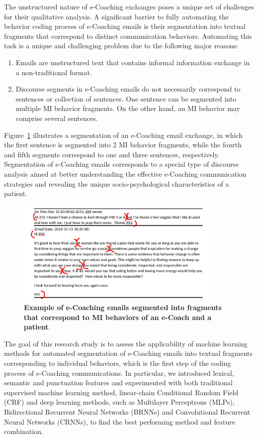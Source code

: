 \documentclass{amia}
\begin{document}
The unstructured nature of e-Coaching exchanges poses a unique set of challenges for their qualitative analysis. A significant barrier to fully automating the behavior coding process of e-Coaching emails is their segmentation into textual fragments that correspond to distinct communication behaviors. Automating this task is a unique and challenging problem due to the following major reasons:

\begin{enumerate}
\item Emails are unstructured text that contains informal information exchange in a non-traditional format.
\item Discourse segments in e-Coaching emails do not necessarily correspond to sentences or collection of sentences. One sentence can be segmented into multiple MI behavior fragments. On the other hand, an MI behavior may comprise several sentences.
\end{enumerate}

Figure~\ref{fig:text-segment} illustrates a segmentation of an e-Coaching email exchange, in which the first sentence is segmented into 2 MI behavior fragments, while the fourth and fifth segments correspond to one and three sentences, respectively. Segmentation of e-Coaching emails corresponds to a special type of discourse analysis \cite{webber2012discourse} aimed at better understanding the effective e-Coaching communication strategies and revealing the unique socio-psychological characteristics of a patient.

\begin{figure}[!htb]
    \centering
    \includegraphics[width=0.9\textwidth]{figures/segment-example.png}
    \caption{\textbf{Example of e-Coaching emails segmented into fragments that correspond to MI behaviors of an e-Coach and a patient}.}
    \label{fig:text-segment}
\end{figure}

The goal of this research study is to assess the applicability of machine learning methods for automated segmentation of e-Coaching emails into textual fragments corresponding to individual behaviors, which is the first step of the coding process of e-Coaching communications. In particular, we introduced lexical, semantic and punctuation features and experimented with both traditional supervised machine learning method, linear-chain Conditional Random Field (CRF) and deep learning methods, such as Multilayer Perceptrons (MLPs), Bidirectional Recurrent Neural Networks (BRNNs) and Convolutional Recurrent Neural Networks (CRNNs), to find the best performing method and feature combination. 
\end{document}
